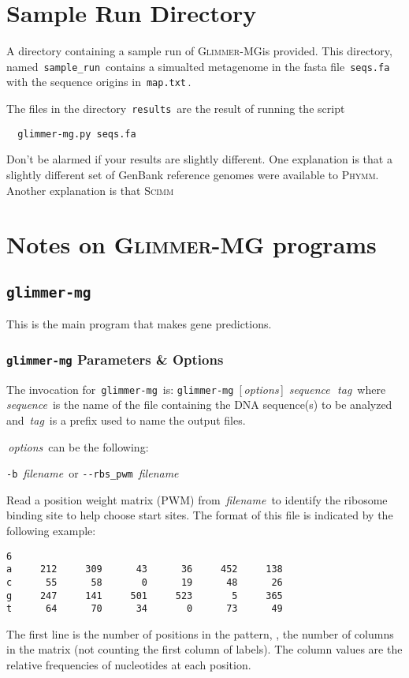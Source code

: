 \documentclass[fleqn,titlepage,11pt]{article}
\def\Desc#1{\,\mbox{\emph{#1}}\,}
\def\Gmg{\textsc{Glimmer-MG}}
\def\Phymm{\textsc{Phymm}}
\def\Scimm{\textsc{Scimm}}
\def\Pg#1{\texttt{#1}}
\begin{document}
\section{Sample Run Directory}

A directory containing a sample run of \Gmg is provided.  This
directory, named \,\Pg{sample\_run}\, contains a simualted metagenome
in the fasta file \,\Pg{seqs.fa}\, with the sequence origins in
\,\Pg{map.txt}\,.

The files in the directory \,\Pg{results}\, are the result of
running the script
\BSV
\begin{verbatim}
  glimmer-mg.py seqs.fa
\end{verbatim}
\ESV

Don't be alarmed if your results are slightly different. One
explanation is that a slightly different set of GenBank reference
genomes were available to \Phymm. Another explanation is that \Scimm

\section{Notes on \Gmg{} programs}
\subsection{\Pg{glimmer-mg}}

This is the main program that makes gene predictions.

\subsubsection{\Pg{glimmer-mg} Parameters \& Options}
The invocation for \,\Pg{glimmer-mg}\, is:
\bq
  \Pg{glimmer-mg}\, [\Desc{options}] \Desc{sequence} \Desc{tag}
\eq
where \Desc{sequence} is the name of the file containing the DNA
sequence(s) to be analyzed and \Desc{tag} is a prefix used to name the
output files.

\Desc{options} can be the following:
\bl{}\RaggedRight

\exdent
  \verb`-b` \Desc{filename} \enskip or \enskip \verb`--rbs_pwm` \Desc{filename}

  Read a position weight matrix (PWM) from \Desc{filename} to identify
  the ribosome binding site to help choose start sites.  The format of
  this file is indicated by the following example:
\BSV
\begin{verbatim}
6
a     212     309      43      36     452     138
c      55      58       0      19      48      26
g     247     141     501     523       5     365
t      64      70      34       0      73      49
\end{verbatim}
\ESV
  The first line is the number of positions in the pattern, \ie,
  the number of columns in the matrix (not counting
  the first column of labels).  The column values are the relative
  frequencies of nucleotides at each position.
\end{document}
